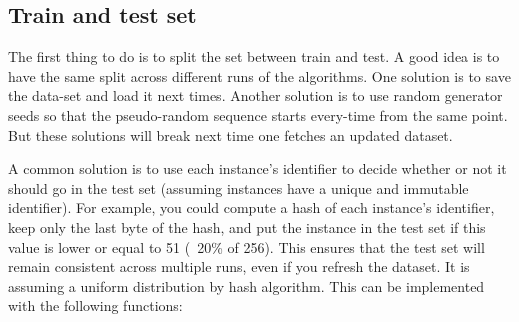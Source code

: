 \documentclass[12pt, letterpaper]{article}
\theoremstyle{definition}
\begin{document}
\subsection{Train and test set}
The first thing to do is to split the set between train and test. A good idea is to have the same split across different runs of the algorithms. One solution is to save the data-set and load it next times. Another solution is to use random generator seeds so that the pseudo-random sequence starts every-time from the same point. But these solutions will break next time one fetches an updated dataset. 

A common solution is to use each instance's identifier to decide whether or not it should go in the test set (assuming instances have a unique and immutable identifier). For example, you could compute a hash of each instance's identifier, keep only the last byte of the hash, and put the instance in the test set if this value is lower or equal to 51 (~20\% of 256). This ensures that the test set will remain consistent across multiple runs, even if you refresh the dataset. It is assuming a uniform distribution by hash algorithm. This can be implemented with the following functions:
\end{document}
